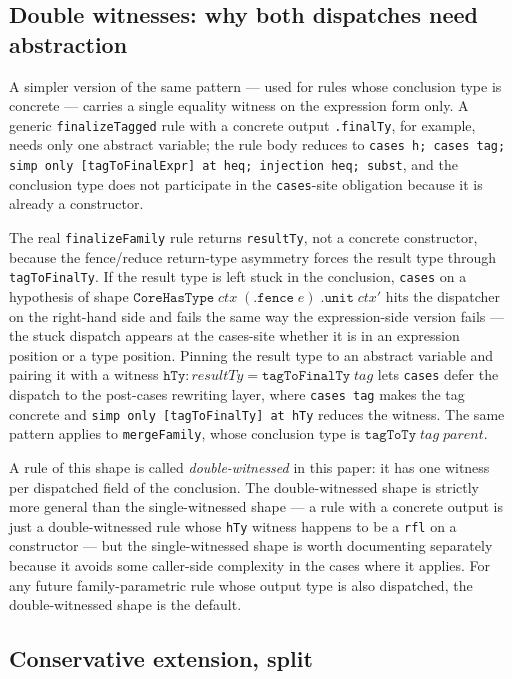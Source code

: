 \documentclass[acmsmall,screen,review,anonymous,nonacm]{acmart}
\newcommand{\CoreHasType}{\texttt{CoreHasType}}
\begin{document}
\subsection{Double witnesses: why both dispatches need abstraction}\label{sec:double-witnesses}

A simpler version of the same pattern --- used for rules whose conclusion type is concrete --- carries a single equality witness on the expression form only. A generic \texttt{finalizeTagged} rule with a concrete output \texttt{.finalTy}, for example, needs only one abstract variable; the rule body reduces to \texttt{cases h; cases tag; simp only [tagToFinalExpr] at heq; injection heq; subst}, and the conclusion type does not participate in the \texttt{cases}-site obligation because it is already a constructor.

The real \texttt{finalizeFamily} rule returns \texttt{resultTy}, not a concrete constructor, because the fence/reduce return-type asymmetry forces the result type through \texttt{tagToFinalTy}. If the result type is left stuck in the conclusion, \texttt{cases} on a hypothesis of shape $\CoreHasType\;\mathit{ctx}\;(\texttt{.fence}\;e)\;\texttt{.unit}\;\mathit{ctx'}$ hits the dispatcher on the right-hand side and fails the same way the expression-side version fails --- the stuck dispatch appears at the cases-site whether it is in an expression position or a type position. Pinning the result type to an abstract variable and pairing it with a witness $\texttt{hTy} : \mathit{resultTy} = \texttt{tagToFinalTy}\;\mathit{tag}$ lets \texttt{cases} defer the dispatch to the post-cases rewriting layer, where \texttt{cases tag} makes the tag concrete and \texttt{simp only [tagToFinalTy] at hTy} reduces the witness. The same pattern applies to \texttt{mergeFamily}, whose conclusion type is $\texttt{tagToTy}\;\mathit{tag}\;\mathit{parent}$.

A rule of this shape is called \emph{double-witnessed} in this paper: it has one witness per dispatched field of the conclusion. The double-witnessed shape is strictly more general than the single-witnessed shape --- a rule with a concrete output is just a double-witnessed rule whose \texttt{hTy} witness happens to be a \texttt{rfl} on a constructor --- but the single-witnessed shape is worth documenting separately because it avoids some caller-side complexity in the cases where it applies. For any future family-parametric rule whose output type is also dispatched, the double-witnessed shape is the default.

\subsection{Conservative extension, split}\label{sec:conservative-extension}
\end{document}
